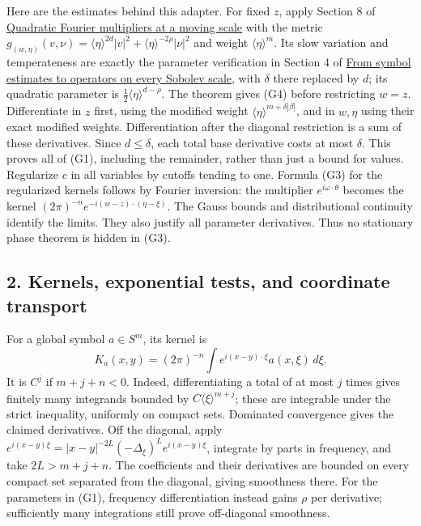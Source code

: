 \documentclass[
  11pt,
]{article}
\begin{document}
Here are the estimates behind this adapter. For fixed \(z\), apply
Section 8 of \href{gauss-transform-estimates.pdf}{Quadratic Fourier
multipliers at a moving scale} with the metric
\(g_{(w,\eta)}(v,\nu)=\langle\eta\rangle^{2d}|v|^2+\langle\eta\rangle^{-2\rho}|\nu|^2\)
and weight \(\langle\eta\rangle^m\). Its slow variation and
temperateness are exactly the parameter verification in Section 4 of
\href{euclidean-symbol-calculus.pdf}{From symbol estimates to operators
on every Sobolev scale}, with \(\delta\) there replaced by \(d\); its
quadratic parameter is \(\frac12\langle\eta\rangle^{d-\rho}\). The
theorem gives (G4) before restricting \(w=z\). Differentiate in \(z\)
first, using the modified weight
\(\langle\eta\rangle^{m+\delta|\beta|}\), and in \(w,\eta\) using their
exact modified weights. Differentiation after the diagonal restriction
is a sum of these derivatives. Since \(d\leq\delta\), each total base
derivative costs at most \(\delta\). This proves all of (G1), including
the remainder, rather than just a bound for values. Regularize \(c\) in
all variables by cutoffs tending to one. Formula (G3) for the
regularized kernels follows by Fourier inversion: the multiplier
\(e^{i\omega\cdot\theta}\) becomes the kernel
\((2\pi)^{-n}e^{-i(w-z)\cdot(\eta-\xi)}\). The Gauss bounds and
distributional continuity identify the limits. They also justify all
parameter derivatives. Thus no stationary phase theorem is hidden in
(G3).

\subsection{2. Kernels, exponential tests, and coordinate
transport}\label{kernels-exponential-tests-and-coordinate-transport}

For a global symbol \(a\in S^m\), its kernel is \[
K_a(x,y)=(2\pi)^{-n}\int e^{i(x-y)\cdot\xi}a(x,\xi)\,d\xi.
\tag{G5}
\] It is \(C^j\) if \(m+j+n<0\). Indeed, differentiating a total of at
most \(j\) times gives finitely many integrands bounded by
\(C\langle\xi\rangle^{m+j}\); these are integrable under the strict
inequality, uniformly on compact sets. Dominated convergence gives the
claimed derivatives. Off the diagonal, apply
\(e^{i(x-y)\xi}=|x-y|^{-2L}(-\Delta_\xi)^L e^{i(x-y)\xi}\), integrate by
parts in frequency, and take \(2L>m+j+n\). The coefficients and their
derivatives are bounded on every compact set separated from the
diagonal, giving smoothness there. For the parameters in (G1), frequency
differentiation instead gains \(\rho\) per derivative; sufficiently many
integrations still prove off-diagonal smoothness.
\end{document}
